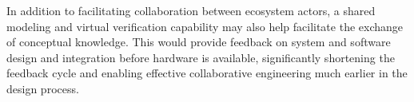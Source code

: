 In addition to facilitating collaboration between ecosystem actors, a shared modeling and virtual verification capability may also help facilitate the exchange of conceptual knowledge. This would provide feedback on system and software design and integration before hardware is available, significantly shortening the feedback cycle and enabling effective collaborative engineering much earlier in the design process.


